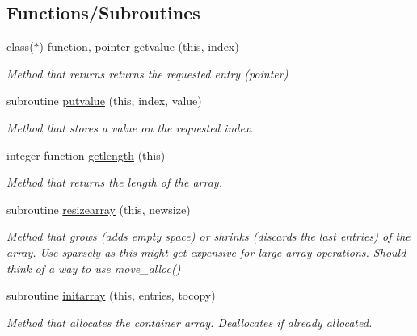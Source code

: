 \subsection*{Functions/\+Subroutines}
\begin{DoxyCompactItemize}
\item 
class($\ast$) function, pointer \mbox{\hyperlink{namespaceabstract__container__array__mod_a2b3e0aec504d76c73bf7f18158924af4}{getvalue}} (this, index)
\begin{DoxyCompactList}\small\item\em Method that returns returns the requested entry (pointer) \end{DoxyCompactList}\item 
subroutine \mbox{\hyperlink{namespaceabstract__container__array__mod_aae1f6309c51e282a528ce78f128443e0}{putvalue}} (this, index, value)
\begin{DoxyCompactList}\small\item\em Method that stores a value on the requested index. \end{DoxyCompactList}\item 
integer function \mbox{\hyperlink{namespaceabstract__container__array__mod_a22d71ca3f03bf0bb5d3737338e5e349a}{getlength}} (this)
\begin{DoxyCompactList}\small\item\em Method that returns the length of the array. \end{DoxyCompactList}\item 
subroutine \mbox{\hyperlink{namespaceabstract__container__array__mod_ac2d73eb111ffde938f81e3f93b0cb3e0}{resizearray}} (this, newsize)
\begin{DoxyCompactList}\small\item\em Method that grows (adds empty space) or shrinks (discards the last entries) of the array. Use sparsely as this might get expensive for large array operations. Should think of a way to use move\+\_\+alloc() \end{DoxyCompactList}\item 
subroutine \mbox{\hyperlink{namespaceabstract__container__array__mod_a6a8e7af177f333262aba941775d6c245}{initarray}} (this, entries, tocopy)
\begin{DoxyCompactList}\small\item\em Method that allocates the container array. Deallocates if already allocated. \end{DoxyCompactList}\end{DoxyCompactItemize}



